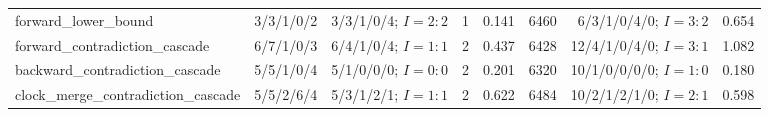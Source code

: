\begin{table}[t]
\begin{adjustbox}{max width=\textwidth}
\begin{tabular}{@{}lrrrrrrr@{}}
forward\_lower\_bound & 3/3/1/0/2 & 3/3/1/0/4; $I=2:2$ & 1 & 0.141 & 6460 & 6/3/1/0/4/0; $I=3:2$ & 0.654\\
forward\_contradiction\_cascade & 6/7/1/0/3 & 6/4/1/0/4; $I=1:1$ & 2 & 0.437 & 6428 & 12/4/1/0/4/0; $I=3:1$ & 1.082\\
backward\_contradiction\_cascade & 5/5/1/0/4 & 5/1/0/0/0; $I=0:0$ & 2 & 0.201 & 6320 & 10/1/0/0/0/0; $I=1:0$ & 0.180\\
clock\_merge\_contradiction\_cascade & 5/5/2/6/4 & 5/3/1/2/1; $I=1:1$ & 2 & 0.622 & 6484 & 10/2/1/2/1/0; $I=2:1$ & 0.598\\
\bottomrule
\end{tabular}\end{adjustbox}
\end{table}
